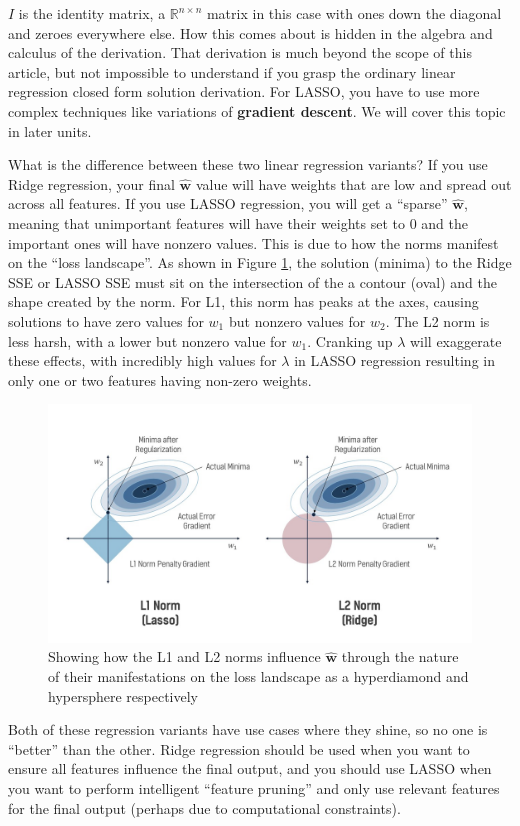 \begin{flushleft}
    $I$ is the identity matrix, a $\mathbb{R}^{n \times n}$ matrix in this case with ones down the diagonal and zeroes everywhere else. How this comes about is hidden in the algebra and calculus of the derivation. That derivation is much beyond the scope of this article, but not impossible to understand if you grasp the ordinary linear regression closed form solution derivation. For LASSO, you have to use more complex techniques like variations of \textbf{gradient descent}. We will cover this topic in later units. \break

    What is the difference between these two linear regression variants? If you use Ridge regression, your final $\hat{\textbf{w}}$ value will have weights that are low and spread out across all features. If you use LASSO regression, you will get a ``sparse'' $\hat{\textbf{w}}$, meaning that unimportant features will have their weights set to 0 and the important ones will have nonzero values. This is due to how the norms manifest on the ``loss landscape''. As shown in Figure \ref{fig:l1_l2}, the solution (minima) to the Ridge SSE or LASSO SSE must sit on the intersection of the a contour (oval) and the shape created by the norm. For L1, this norm has peaks at the axes, causing solutions to have zero values for $w_1$ but nonzero values for $w_2$. The L2 norm is less harsh, with a lower but nonzero value for $w_1$. Cranking up $\lambda$ will exaggerate these effects, with incredibly high values for $\lambda$ in LASSO regression resulting in only one or two features having non-zero weights.

    \begin{figure}[H]
        \centering
        \includegraphics[width=0.9\linewidth]{ml/l1_l2.jpg}
        \caption{Showing how the L1 and L2 norms influence $\hat{\textbf{w}}$ through the nature of their manifestations on the loss landscape as a hyperdiamond and hypersphere respectively}
        \label{fig:l1_l2}
    \end{figure}

    Both of these regression variants have use cases where they shine, so no one is ``better'' than the other. Ridge regression should be used when you want to ensure all features influence the final output, and you should use LASSO when you want to perform intelligent ``feature pruning'' and only use relevant features for the final output (perhaps due to computational constraints).
\end{flushleft}

